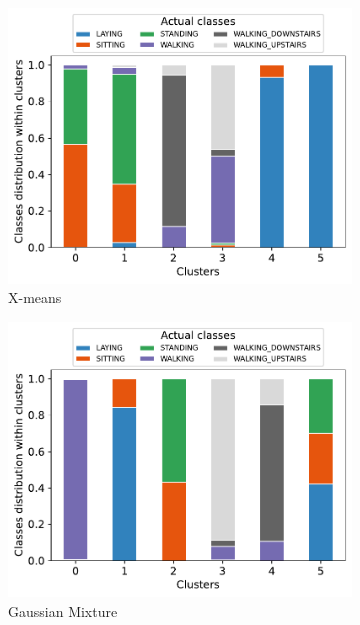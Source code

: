 \documentclass[10pt, a4paper, twocolumn]{article}
\begin{document}
\begin{figure}[t]
\begin{subfigure}[t]{0.196\textwidth}
        \includegraphics[width=\linewidth]{immagini simone/xmeans_distr.pdf}
        \caption{X-means}
        \label{fig:xmeans_charact}
    \end{subfigure}  
    \begin{subfigure}[t]{0.196\textwidth}
        \includegraphics[width=\linewidth]{immagini simone/gausmix_ditr.pdf}
        \caption{Gaussian Mixture}
        \label{fig:gaussmix_charact}
    \end{subfigure}
    \begin{subfigure}[t]{0.196\textwidth}

\end{subfigure}
\end{figure}
\end{document}
